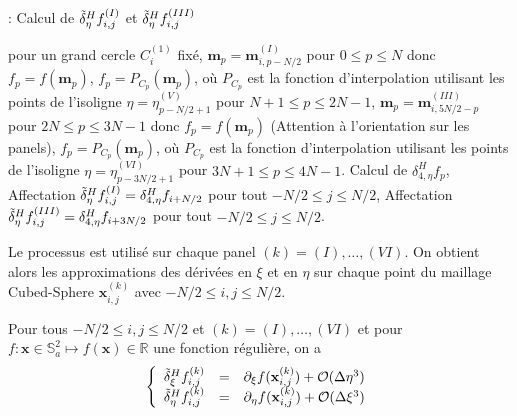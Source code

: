 \begin{center}
\begin{minipage}[H]{12cm}
  \begin{algorithm}[H]
    \caption{: Calcul de $\tilde{\delta}^H_{\eta} f_{i, j}^{(I)}$ et $\tilde{\delta}^H_{\eta} f_{i, j}^{(III)}$}\label{alg:deltaeta}
    \begin{algorithmic}[1]
    \State pour un grand cercle $C_i^{(1)}$ fixé,
             \State  $\mathbf{m}_p = \mathbf{m}_{i,p-N/2}^{(I)}$ pour $0  \leq p \leq N$ donc $f_p = f(\mathbf{m}_p)$,
             \State $f_p = P_{C_p}(\mathbf{m}_p)$, où $P_{C_p}$ est la fonction d'interpolation utilisant les points de l'isoligne $\eta = \eta^{(V)}_{p-N/2+1}$ pour $N+1 \leq p \leq 2N-1$,
             \State  $\mathbf{m}_p = \mathbf{m}_{i,5N/2-p}^{(III)}$ pour $2N  \leq p \leq 3N-1$ donc $f_p = f(\mathbf{m}_p)$ (Attention à l'orientation sur les panels),
             \State $f_p = P_{C_p}(\mathbf{m}_p)$, où $P_{C_p}$ est la fonction d'interpolation utilisant les points de l'isoligne $\eta = \eta^{(VI)}_{p-3N/2+1}$ pour $3N+1 \leq p \leq 4N-1$.
            \EndFor
    \State Calcul de $\delta_{4, \eta}^H f_p$,
    \State Affectation $\tilde{\delta}^H_{\eta} f_{i,j}^{(I)} = \delta_{4, \eta}^H f_{i+N/2}$ pour tout $-N/2 \leq j \leq N/2$,
    \State Affectation $\tilde{\delta}^H_{\eta} f_{i,j}^{(III)} = \delta_{4, \eta}^H f_{i+3N/2}$ pour tout $-N/2 \leq j \leq N/2$.
    \EndFor
    \end{algorithmic}
    \end{algorithm}
\end{minipage}
\end{center}
Le processus est utilisé sur chaque panel $(k) = (I), \ldots , (VI)$. On obtient alors les approximations des dérivées en $\xi$ et en $\eta$ sur chaque point du maillage Cubed-Sphere $\mathbf{x}_{i,j}^{(k)}$ avec $-N/2 \leq i,j \leq N/2$.

\begin{theoreme}
Pour tous $-N/2 \leq i,j \leq N/2$ et $(k) = (I) , \ldots , (VI)$ et pour $f : \mathbf{x} \in \mathbb{S}_a^2 \mapsto f(\mathbf{x}) \in \mathbb{R}$ une fonction régulière, on a 
\begin{equation}
\left\lbrace
\begin{array}{rcl}
\tilde{\delta}^H_{\xi} f_{i,j}^{(k)} & = & \partial_{\xi} f(\mathbf{x}_{i,j}^{(k)}) + \mathcal{O}(\Delta \eta^3) \\
\tilde{\delta}^H_{\eta} f_{i,j}^{(k)} & = & \partial_{\eta} f(\mathbf{x}_{i,j}^{(k)}) + \mathcal{O}(\Delta \xi^3)
\end{array}
\right.
\end{equation}
\label{th:consistance_der_xieta}
\end{theoreme}

